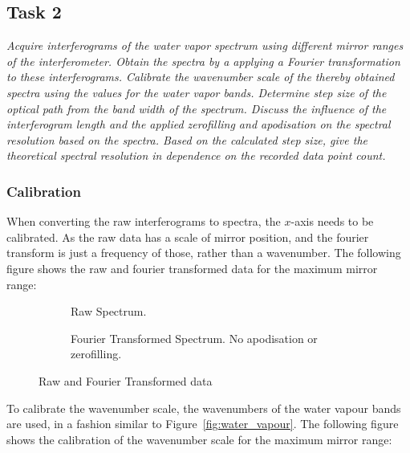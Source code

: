\documentclass{article}
\begin{document}
\pagebreak{}

\subsection{Task 2}

\textit{Acquire interferograms of the water vapor spectrum using different mirror ranges of the
interferometer. Obtain the spectra by a applying a Fourier transformation to these interferograms.
Calibrate the wavenumber scale of the thereby obtained spectra using the values for the water
vapor bands. Determine step size of the optical path from the band width of the spectrum.
Discuss the influence of the interferogram length and the applied zerofilling and apodisation on
the spectral resolution based on the spectra. Based on the calculated step size, give the
theoretical spectral resolution in dependence on the recorded data point count.}

\subsubsection{Calibration}

When converting the raw interferograms to spectra, the $x$-axis needs to be calibrated. As the raw data has a scale of mirror position, and the fourier transform is just a frequency of those, rather than a wavenumber. The following figure shows the raw and fourier transformed data for the maximum mirror range:

\begin{figure}[h!]
	\centering
	\begin{subfigure}[t]{0.48\textwidth}
		\centering
		\scalebox{0.5}{}
		\caption{Raw Spectrum.}
		\label{fig:air32000mirrored}
	\end{subfigure} \hfill
	\begin{subfigure}[t]{0.48\textwidth}
		\centering
		\scalebox{0.5}{}
		\caption{Fourier Transformed Spectrum. No apodisation or zerofilling.}
		\label{fig:air32000fourier}
	\end{subfigure}
	\caption{Raw and Fourier Transformed data}
	\label{fig:air32000}
\end{figure}

To calibrate the wavenumber scale, the wavenumbers of the water vapour bands are used, in a fashion similar to Figure~\ref{fig:water_vapour}. The following figure shows the calibration of the wavenumber scale for the maximum mirror range:
\end{document}
